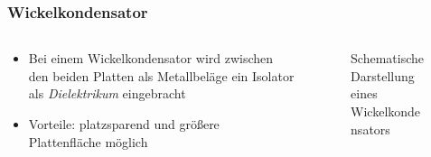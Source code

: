 \begin{frame}
\frametitle{Wickelkondensator}
\begin{columns}
    \begin{column}{0.48\textwidth}
    \begin{itemize}
  \item Bei einem Wickelkondensator wird zwischen den beiden Platten als Metallbeläge ein Isolator als \emph{Dielektrikum} eingebracht
  \item Vorteile: platzsparend und größere Plattenfläche möglich
  \end{itemize}

    \end{column}
   \begin{column}{0.48\textwidth}
       
\begin{figure}
    \caption{\scriptsize Schematische Darstellung eines Wickelkondensators}
    \label{e_wickelkondensator}
\end{figure}


   \end{column}
\end{columns}

\end{frame}

